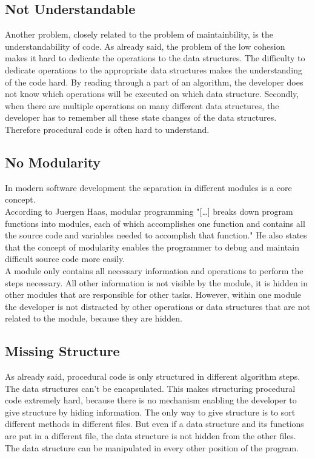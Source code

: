 \subsection*{Not Understandable}
Another problem, closely related to the problem of maintainbility, is the understandability of code. As already said, the problem of the low cohesion makes it hard to dedicate the operations to the data structures. The difficulty to dedicate operations to the appropriate data structures makes the understanding of the code hard. By  reading through a part of an algorithm, the developer does not know which operations will be executed on which data structure. Secondly, when there are multiple operations on many different data structures, the developer has to remember all these state changes of the data structures. Therefore procedural code is often hard to understand. 

\subsection*{No Modularity}
\label{problem:nomodularity}
In modern software development the separation in different modules is a core concept.\\

According to Juergen Haas, modular programming "[\dots{}] breaks down program functions into modules, each of which accomplishes one function and contains all the source code and variables needed to accomplish that function." \cite{about} He also states that the concept of modularity enables the programmer to debug and maintain difficult source code more easily. \\

A module only contains all necessary information and operations to perform the steps necessary. All other information is not visible by the module, it is hidden in other modules that are responsible for other tasks. However, within one module the developer is not distracted by other operations or data structures that are not related to the module, because they are hidden. 

\subsection*{Missing Structure}
As already said, procedural code is only structured in different algorithm steps. The data structures can't be encapsulated. This makes structuring procedural code extremely hard, because there is no mechanism enabling the developer to give structure by hiding information. The only way to give structure is to sort different methods in different files. But even if a data structure and its functions are put in a different file, the data structure is not hidden from the other files. The data structure can be manipulated in every other position of the program.


